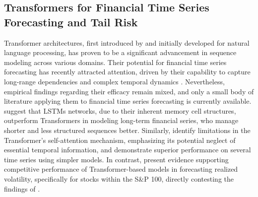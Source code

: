 





 

\subsection{Transformers for Financial Time Series Forecasting and Tail Risk}
\label{sec:2.3_transformers}
Transformer architectures, first introduced by \textcite{vaswani2017attention} and initially developed for natural language processing, has proven to be a significant advancement in sequence modeling across various domains. Their potential for financial time series forecasting has recently attracted attention, driven by their capability to capture long-range dependencies and complex temporal dynamics \parencite{lezmi2023time}. Nevertheless, empirical findings regarding their efficacy remain mixed, and only a small body of literature applying them to financial time series forecasting is currently available. \textcite{Sonata2024} suggest that LSTMs networks, due to their inherent memory cell structures, outperform Transformers in modeling long-term financial series, who manage shorter and less structured sequences better. Similarly, \textcite{Zeng2023} identify limitations in the Transformer's self-attention mechanism, emphasizing its potential neglect of essential temporal information, and demonstrate superior performance on several time series using simpler models. In contrast, \textcite{souto2024can} present evidence supporting competitive performance of Transformer-based models in forecasting realized volatility, specifically for stocks within the S\&P 100, directly contesting the findings of \textcite{Zeng2023}.

